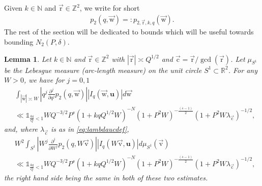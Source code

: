 \documentclass[letterpaper,11pt]{amsart}
\numberwithin{equation}{section}
\newtheorem{lemma}[theorem]{Lemma}
\theoremstyle{definition}
\numberwithin{equation}{section}
\newcommand{\uu}{\mathbf{u}}
\newcommand{\ur}{\vec{\mathrm{r}}}
\newcommand{\uw}{{\vec{\mathrm{w}}}}
\newcommand{\uv}{{\vec{\mathrm{v}}}}
\newcommand{\uc}{{\vec{\mathrm{c}}}}
\newcommand{\R}{\mathbb{R}}
\begin{document}
 Given $k\in \mathbb N$ and $\ur\in \mathbb Z^2 $, we write for short
	\begin{align*}
	p_2(q, \uw)=:p_{2,\ur,k,q}(\uw).
	\end{align*}
    The rest of the section will be dedicated to bounds which will be useful towards bounding $N_2(P,\delta)$.
		\begin{lemma}\label{p1integral} 
		 Let $k\in \mathbb N$ and $\ur \in \mathbb Z^2$ with $|\ur|\asymp Q^{1/2}$ and $\uc=\ur/\gcd(\ur)$.  Let \(\mu_{S^1}\) be the Lebesgue measure (arc-length measure) on the unit circle \(S^1\subset \R^2\).
		For any $W>0$, we have for $j=0,1$ 
			\begin{align*}
			&
			\int _{|\uw |\asymp W} 
			|q^j\frac{\partial^j}{\partial q^j}p_{2}(q, \uw)||I_q(\uw, \uu)|d\uw\\&\ll \mathds 1_{\frac{kq}{Q}<1}
			WQ^{-3/2} P^{s}
			( 1+kqQ^{1/2}W)^{-N}
			(1+P^2W)^{-\frac{(s-1)}{2}}(1+P^2W\lambda_\uc)^{-1/2},
			\end{align*}
   and, where $\lambda_\uc$ is as in \eqref{eq:lambdaucdef}, 
			\begin{align*}
			&
			W^2\int _{S^1} 
			|W^j\frac{\partial^j}{\partial W^j}p_{2}(q, W\uv)||I_q(W\uv, \uu)|d\mu_{S^1}(\uv)\\&\ll \mathds 1_{\frac{kq}{Q}<1}
			WQ^{-3/2} P^{s}
			( 1+kqQ^{1/2}W)^{-N}
			(1+P^2W)^{-\frac{(s-1)}{2}}(1+P^2W\lambda_\uc)^{-1/2},
			\end{align*}
			the right hand side being the same in both of these two estimates.
		\end{lemma}
\end{document}
